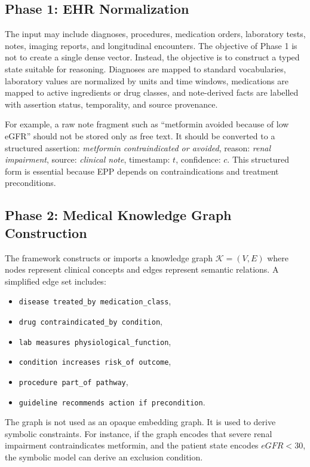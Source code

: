 \documentclass[english,5p,twocolumn,preprint]{elsarticle}
\newcommand{\KG}{\mathcal{K}}
\begin{document}
\subsection{Phase 1: EHR Normalization}
The input may include diagnoses, procedures, medication orders, laboratory tests, notes, imaging reports, and longitudinal encounters. The objective of Phase 1 is not to create a single dense vector. Instead, the objective is to construct a typed state suitable for reasoning. Diagnoses are mapped to standard vocabularies, laboratory values are normalized by units and time windows, medications are mapped to active ingredients or drug classes, and note-derived facts are labelled with assertion status, temporality, and source provenance. 

For example, a raw note fragment such as ``metformin avoided because of low eGFR'' should not be stored only as free text. It should be converted to a structured assertion: \emph{metformin contraindicated or avoided}, reason: \emph{renal impairment}, source: \emph{clinical note}, timestamp: $t$, confidence: $c$. This structured form is essential because EPP depends on contraindications and treatment preconditions.

\subsection{Phase 2: Medical Knowledge Graph Construction}
The framework constructs or imports a knowledge graph $\KG=(V,E)$ where nodes represent clinical concepts and edges represent semantic relations. A simplified edge set includes:
\begin{itemize}[leftmargin=*]
    \item \texttt{disease treated\_by medication\_class},
    \item \texttt{drug contraindicated\_by condition},
    \item \texttt{lab measures physiological\_function},
    \item \texttt{condition increases risk\_of outcome},
    \item \texttt{procedure part\_of pathway},
    \item \texttt{guideline recommends action if precondition}.
\end{itemize}
The graph is not used as an opaque embedding graph. It is used to derive symbolic constraints. For instance, if the graph encodes that severe renal impairment contraindicates metformin, and the patient state encodes $eGFR < 30$, the symbolic model can derive an exclusion condition.
\end{document}
